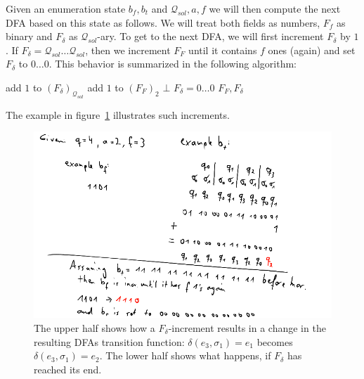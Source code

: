 
Given an enumeration state $b_f, b_t$ and $\mathcal{Q}_{sol}, a, f$ we will then compute the next DFA based on this state as follows. We will treat both fields as numbers, $F_f$ as binary and $F_\delta$ as $\mathcal{Q}_{sol}$-ary. To get to the next DFA, we will first increment $F_\delta$ by $1$. If $F_\delta = \mathcal{Q}_{sol} \ldots \mathcal{Q}_{sol}$, then we increment $F_F$ until it contains $f$ ones (again) and set $F_\delta$ to $0 \ldots 0$.  This behavior is summarized in the following algorithm: 
\vspace{0.2cm}
\begin{algorithmic}[1]
	\State add $1$ to $(F_\delta)_{\mathcal{Q}_{sol}}$
		 
			\State add $1$ to $(F_F)_2$
				\State \Return $\bot$
			\EndIf
		\State $F_\delta = 0 \ldots 0$
		\EndWhile
	\EndIf
	\State \Return $F_F, F_\delta$
	\EndFunction
\end{algorithmic}
\vspace{0.2cm}
The example in figure~\ref{fig:dfa_enum_incr} illustrates such increments.


\begin{figure}
	\includegraphics[width=\linewidth]{images/dfa_enum_incr.png}
	\caption{The upper half shows how a $F_\delta$-increment results in a change in the resulting DFAs transition function: $\delta(e_3, \sigma_1) = e_1$ becomes $\delta(e_3, \sigma_1) = e_2$. The lower half shows what happens, if $F_\delta$ has reached its end.}
	\label{fig:dfa_enum_incr}
\end{figure}

